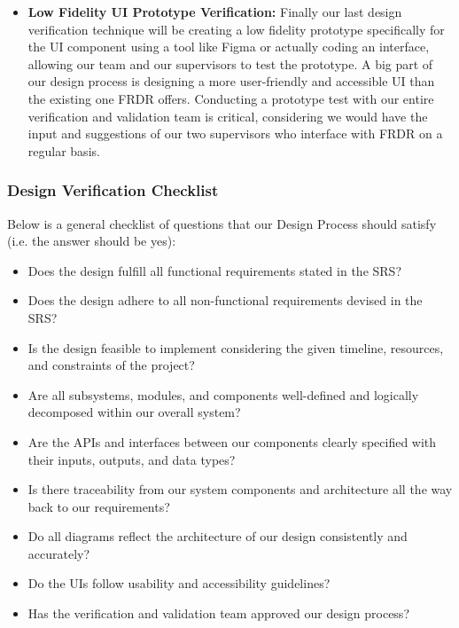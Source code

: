 \documentclass[12pt, titlepage]{article}
\begin{document}
\begin{itemize}
{  }
  \item{\textbf{Low Fidelity UI Prototype Verification:} Finally our last design verification technique will be creating a low fidelity prototype specifically 
  for the UI component using a tool like Figma or actually coding an interface, allowing our team and our supervisors to test the prototype. 
  A big part of our design process is designing a more user-friendly and accessible UI than the existing one FRDR offers. Conducting a 
  prototype test with our entire verification and validation team is critical, considering we would have the input and suggestions of our 
  two supervisors who interface with FRDR on a regular basis.
  }
\end{itemize}

\subsubsection{Design Verification Checklist}

\par{Below is a general checklist of questions that our Design Process should satisfy (i.e. the answer should be yes):}

\begin{itemize}
  \item{Does the design fulfill all functional requirements stated in the SRS?}
  \item{Does the design adhere to all non-functional requirements devised in the SRS?}
  \item{Is the design feasible to implement considering the given timeline, resources, and constraints of the project?}
  \item{Are all subsystems, modules, and components well-defined and logically decomposed within our overall system?}
  \item{Are the APIs and interfaces between our components clearly specified with their inputs, outputs, and data types?}
  \item{Is there traceability from our system components and architecture all the way back to our requirements?}
  \item{Do all diagrams reflect the architecture of our design consistently and accurately?}
  \item{Do the UIs follow usability and accessibility guidelines?}
  \item{Has the verification and validation team approved our design process?}
\end{itemize}
\end{document}
